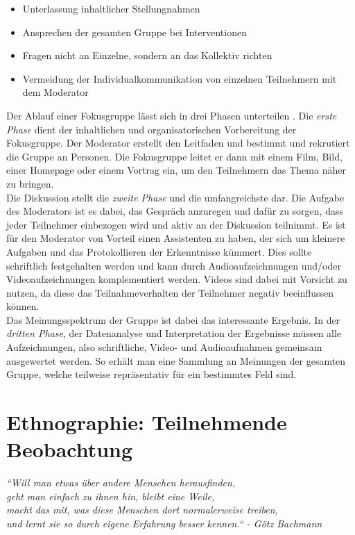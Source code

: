 \begin{itemize}
	\item Unterlassung inhaltlicher Stellungnahmen
	\item Ansprechen der gesamten Gruppe bei Interventionen
	\item Fragen nicht an Einzelne, sondern an das Kollektiv richten
	\item Vermeidung der Individualkommunikation von einzelnen Teilnehmern mit dem Moderator
\end{itemize}

Der Ablauf einer Fokusgruppe lässt sich in drei Phasen unterteilen \cite{schulz_quick_2012}. Die \textit{erste Phase} dient der inhaltlichen und organisatorischen Vorbereitung der Fokusgruppe. Der Moderator erstellt den Leitfaden und bestimmt und rekrutiert die Gruppe an Personen. Die Fokusgruppe leitet er dann mit einem Film, Bild, einer Homepage oder einem Vortrag ein, um den Teilnehmern das Thema näher zu bringen.\\
Die Diskussion stellt die \textit{zweite Phase} und die umfangreichste dar. Die Aufgabe des Moderators ist es dabei, das Gespräch anzuregen und dafür zu sorgen, dass jeder Teilnehmer einbezogen wird und aktiv an der Diskussion teilnimmt. Es ist für den Moderator von Vorteil einen Assistenten zu haben, der sich um kleinere Aufgaben und das Protokollieren der Erkenntnisse kümmert. Dies sollte schriftlich festgehalten werden und kann durch Audioaufzeichnungen und/oder Videoaufzeichnungen komplementiert werden. Videos sind dabei mit Vorsicht zu nutzen, da diese das Teilnahmeverhalten der Teilnehmer negativ beeinflussen können. \\
Das Meinungsspektrum der Gruppe ist dabei das interessante Ergebnis. In der \textit{dritten Phase}, der Datenanalyse und Interpretation der Ergebnisse müssen alle Aufzeichnungen, also schriftliche, Video- und Audioaufnahmen gemeinsam ausgewertet werden. So erhält man eine Sammlung an Meinungen der gesamten Gruppe, welche teilweise repräsentativ für ein bestimmtes Feld sind.

\section{Ethnographie: Teilnehmende Beobachtung}

\textit{``Will man etwas über andere Menschen herausfinden, \\
	geht man einfach zu ihnen hin, bleibt eine Weile, \\ 
	macht das mit, was diese Menschen dort normalerweise treiben, \\ 
	und lernt sie so durch eigene Erfahrung besser kennen.`` - Götz Bachmann} \cite{kuhl_handbuch_2009}


